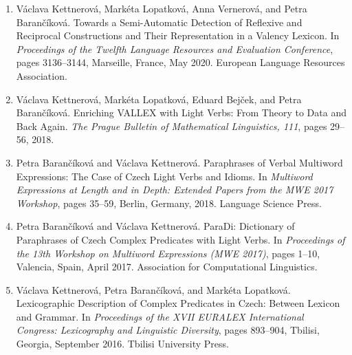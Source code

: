 \documentclass[12pt,a4paper]{report}
\let\openright=\clearpage
\begin{document}
\begin{enumerate}
    \item Václava Kettnerová, Markéta Lopatková, Anna Vernerová, and Petra Barančíková. Towards a Semi-Automatic Detection of Reflexive and Reciprocal Constructions and Their Representation in a Valency Lexicon. In \textit{Proceedings of the Twelfth Language Resources and Evaluation Conference}, pages 3136--3144, Marseille, France, May 2020. European Language Resources Association. 

    \item Václava Kettnerová, Markéta Lopatková, Eduard Bejček, and Petra Barančíková. Enriching VALLEX with Light Verbs: From Theory to Data and Back Again. \textit{The Prague Bulletin of Mathematical Linguistics, 111}, pages 29--56, 2018. 

    \item Petra Barančíková and Václava Kettnerová. Paraphrases of Verbal Multiword Expressions: The Case of Czech Light Verbs and Idioms. In \textit{Multiword Expressions at Length and in Depth: Extended Papers from the MWE 2017 Workshop}, pages 35--59, Berlin, Germany, 2018. Language Science Press. 

    \item Petra Barančíková and Václava Kettnerová. ParaDi: Dictionary of Paraphrases of Czech Complex Predicates with Light Verbs. In \textit{Proceedings of the 13th Workshop on Multiword Expressions (MWE 2017)}, pages 1--10, Valencia, Spain, April 2017. Association for Computational Linguistics. 

    \item Václava Kettnerová, Petra Barančíková, and Markéta Lopatková. Lexicographic Description of Complex Predicates in Czech: Between Lexicon and Grammar. In \textit{Proceedings of the XVII EURALEX International Congress: Lexicography and Linguistic Diversity}, pages 893--904, Tbilisi, Georgia, September 2016. Tbilisi University Press.
\end{enumerate}


\appendix


\openright
\end{document}

